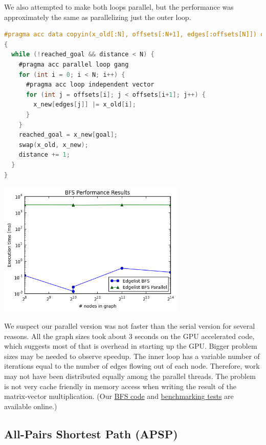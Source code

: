 \documentclass[12pt]{article}
\newcommand*{\ttfamilywithbold}{\fontfamily{lmtt}\selectfont}
\begin{document}
We also attempted to make both loops parallel, but the performance was approximately the same as parallelizing just the outer loop.

\begin{lstlisting}[language=C,basicstyle=\ttfamilywithbold\footnotesize]
#pragma acc data copyin(x_old[:N], offsets[:N+1], edges[:offsets[N]]) copyout(x_new[:N])
{
  while (!reached_goal && distance < N) {
    #pragma acc parallel loop gang
    for (int i = 0; i < N; i++) {
      #pragma acc loop independent vector
      for (int j = offsets[i]; j < offsets[i+1]; j++) {
        x_new[edges[j]] |= x_old[i];
      }
    }
    reached_goal = x_new[goal];
    swap(x_old, x_new);
    distance += 1;
  }
}
\end{lstlisting}

\begin{center}
\includegraphics[width=0.67\textwidth]{bfs-results.png}
\end{center}

We suspect our parallel version was not faster than the serial version for several reasons.
All the graph sizes took about 3 seconds on the GPU accelerated code, which suggests most of that is overhead in starting up the GPU.
Bigger problem sizes may be needed to observe speedup.
The inner loop has a variable number of iterations equal to the number of edges flowing out of each node. Therefore, work may not have been distributed equally among the parallel threads.
The problem is not very cache friendly in memory access when writing the result of the matrix-vector multiplication. (Our \href{https://github.com/span314/cs205group/blob/master/BFS.c}{BFS code} and \href{https://github.com/span314/cs205group/blob/master/bench_bfs.c}{benchmarking tests} are available online.)


\subsection*{All-Pairs Shortest Path (APSP)}
\end{document}
